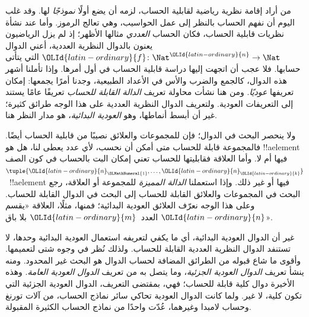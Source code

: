 \documentclass[../../../include/open-logic-section]{subfiles}
\begin{document}

من أراد إقامة نظرية رياضية لقابلية الحساب، لزمه أن يضع أولًا \emph{نموذجًا}
لها. وقد غلب اليوم أن نفهم الحساب بالنظر إلى عمل
الحواسيب، وهي تعالج الرموز. وأما عند نشأة نظريات قابلية الحساب، فكان
الحساب \emph{العددي} مثالها الأظهر؛ إذ لم يزل
الرياضيون يعنون بالدوال النظرية العددية، أعني الدوال
$\OLId{latin-ordinary}{f}\colon \Nat^\OLId{latin-ordinary}{n} \to \Nat$ التي يتأتى حسابها. فلا عجب أن اتجهت
إليها دراسة قابلية الحساب في أول أمرها. وإذا تأملنا أشهر
هذه الدوال، كالجمع والضرب والأس في الأعداد الطبيعية،
وجدنا أمرًا يجمعها: إمكان تعريفها \emph{عوديًا}. ومن هنا نشأت محاولة
تعريف \emph{الدالة القابلة للحساب} تعريفًا عامًا يستند إلى التعريفات العودية.
ولتعريف الدوال النظرية العددية على هذا الوجه طرائق كثيرة؛ غير أن
أبسط أنماطها، وهو \emph{العودية البدائية}، هو مدار النظر هنا.

ولا ينحصر البحث في الدوال؛ فإن للمجموعات والعلائق نصيبًا من قابلية
الحساب أيضًا. فالمجموعة قابلة للحساب متى أمكن أن نحسب، لأي عدد يعطى لنا، هل
هو !!a{element} فيها أم لا. وأما العلاقة فقابليتها للحساب
تعني إمكان البت بالحساب في كون الصف
$\tuple{\OLId{latin-ordinary}{n}_\OLMathNumeral{1},\dots,\OLId{latin-ordinary}{n}_\OLId{latin-ordinary}{k}}$~!!a{element} فيها أو غير ذلك. وإذا استعملنا
\emph{الدالة المميزة} للمجموعة أو العلاقة، رجع البحث في المجموعات
والعلائق القابلة للحساب إلى البحث في الدوال القابلة للحساب. وعلى هذا الوجه
نعرّف العلائق العودية البدائية؛ فمنها، مثلًا، العلاقة «يقسم $\OLId{latin-ordinary}{n}$ العدد~$\OLId{latin-ordinary}{m}$
بلا باق».

غير أن الدوال العودية البدائية، أي ما يكفي لتعريفه استعمال العودية
البدائية وحدها، لا تستنفد الدوال النظرية العددية القابلة للحساب. ولذلك
نُظر في وجوه شتى لتعميمها. وأقوى ما شاع قبوله من الطرائق المضافة
لحساب الدوال هو البحث غير المحدود. ومنه ينشأ تعريف
\emph{الدوال العودية الجزئية}، وما يتصل به من تعريف \emph{الدوال
العودية العامة}. وهذه الأخيرة دوال كلية قابلة للحساب؛ فهي، بمقتضى التعريف،
الدوال العودية الجزئية التي تكون كلية، لا غير. ولما كانت الدوال
العودية تحاكي سائر نماذج الحساب، من آلات تورنغ وحساب لامبدا وغيرهما،
عُدّت واحدًا من نماذج الحساب الكثيرة المقبولة.
\end{document}
